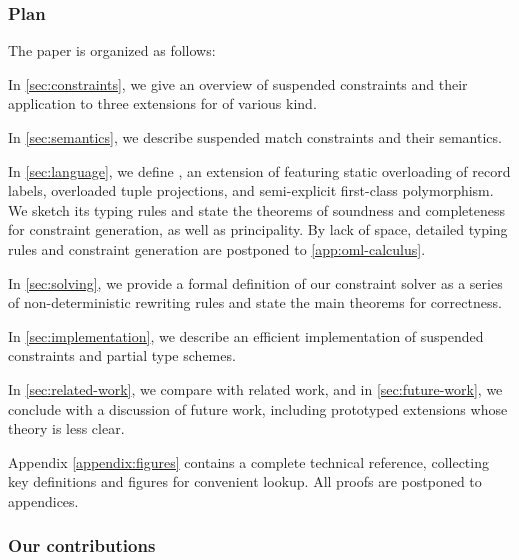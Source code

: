 \documentclass[acmsmall,screen,nonacm,review]{acmart}
\begin{document}
\subsubsection* {Plan}

The paper is organized as follows:
\begin{enumerate*}[label={}]

\item
  In \cref{sec:constraints}, we give an overview of suspended constraints
  and their application to three extensions for \ML of various kind.

\item
  In \cref{sec:semantics}, we describe suspended match constraints and their semantics.

\item
  In \cref{sec:language}, we define \OML, an extension of \ML featuring static
    overloading of record labels, overloaded tuple projections, and
    semi-explicit first-class polymorphism. We sketch its typing rules and
    state the theorems of soundness and completeness for constraint generation,
    as well as principality. By lack of space, detailed typing rules and constraint
    generation are postponed to \cref {app:oml-calculus}.

\item
  In \cref{sec:solving}, we provide a formal definition of our constraint
  solver as a series of non-deterministic rewriting rules and state the main
  theorems for correctness.

\item
  In \cref{sec:implementation}, we describe an efficient implementation
    of suspended constraints and partial type schemes.

\item
  In \cref{sec:related-work}, we compare with related work,
  and in \cref{sec:future-work}, we conclude with a discussion of future work,
  including prototyped extensions whose theory is less clear.

\end{enumerate*}
Appendix \cref{appendix:figures} contains a complete technical reference,
collecting key definitions and figures for convenient lookup. All proofs are
postponed to appendices.

\subsubsection* {Our contributions}
\end{document}
